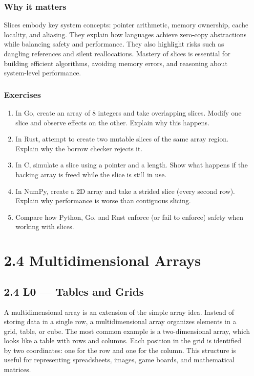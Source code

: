 \documentclass[
  letterpaper,
  DIV=11,
  numbers=noendperiod]{scrreprt}
\providecommand{\tightlist}{%
  \setlength{\itemsep}{0pt}\setlength{\parskip}{0pt}}
\begin{document}
\subsubsection{Why it matters}\label{why-it-matters-20}

Slices embody key system concepts: pointer arithmetic, memory ownership,
cache locality, and aliasing. They explain how languages achieve
zero-copy abstractions while balancing safety and performance. They also
highlight risks such as dangling references and silent reallocations.
Mastery of slices is essential for building efficient algorithms,
avoiding memory errors, and reasoning about system-level performance.

\subsubsection{Exercises}\label{exercises-20}

\begin{enumerate}
\def\labelenumi{\arabic{enumi}.}
\tightlist
\item
  In Go, create an array of 8 integers and take overlapping slices.
  Modify one slice and observe effects on the other. Explain why this
  happens.
\item
  In Rust, attempt to create two mutable slices of the same array
  region. Explain why the borrow checker rejects it.
\item
  In C, simulate a slice using a pointer and a length. Show what happens
  if the backing array is freed while the slice is still in use.
\item
  In NumPy, create a 2D array and take a strided slice (every second
  row). Explain why performance is worse than contiguous slicing.
\item
  Compare how Python, Go, and Rust enforce (or fail to enforce) safety
  when working with slices.
\end{enumerate}

\section{2.4 Multidimensional Arrays}\label{multidimensional-arrays}

\subsection{2.4 L0 --- Tables and Grids}\label{l0-tables-and-grids}

A multidimensional array is an extension of the simple array idea.
Instead of storing data in a single row, a multidimensional array
organizes elements in a grid, table, or cube. The most common example is
a two-dimensional array, which looks like a table with rows and columns.
Each position in the grid is identified by two coordinates: one for the
row and one for the column. This structure is useful for representing
spreadsheets, images, game boards, and mathematical matrices.
\end{document}
